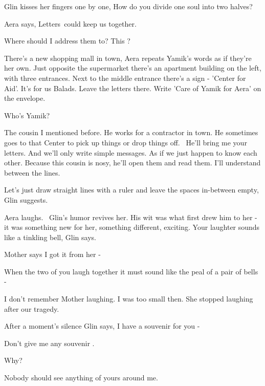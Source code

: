 \documentclass[12pt]{book}
\begin{document}
Glin kisses her fingers one by one, {\textquotedbl}How do you divide one soul into two halves?{\textquotedbl}

Aera says, {\textquotedbl}Letters~could keep us together.{\textquotedbl}

{\textquotedbl}Where should I address them to? This ?{\textquotedbl}

{\textquotedbl}There's a new shopping mall in town,{\textquotedbl} Aera repeats Yamik's words as if they're her own.
{\textquotedbl}Just opposite the supermarket there's an apartment building on the left, with three entrances. Next to
the middle entrance there's a sign - {}'Center for Aid'. It's for us Balads. Leave the letters there. Write 'Care of
Yamik for Aera' on the envelope.{\textquotedbl}

{\textquotedbl}Who's Yamik?{\textquotedbl}

{\textquotedbl}The cousin I mentioned before. He works for a contractor in town. He sometimes goes to that Center to
pick up things or drop things off.~ He'll bring me your letters. And we'll only write simple messages. As if we just
happen to know each other. Because this cousin is nosy, he'll open them and read them. I'll understand between the
lines.{\textquotedbl}

{\textquotedbl}Let's just draw straight lines with a ruler and leave the spaces in-between empty,{\textquotedbl} Glin
suggests.

Aera laughs. ~Glin's humor revives her. His wit was what first drew him to her - it was something new for her, something
different, exciting. {\textquotedbl}Your laughter sounds like a tinkling bell,{\textquotedbl} Glin says.

{\textquotedbl}Mother says I got it from her -{\textquotedbl}

{\textquotedbl}When the two of you laugh together it must sound like the peal of a pair of bells -{\textquotedbl}

{\textquotedbl}I don't remember Mother laughing. I was too small then. She stopped laughing after our
tragedy.{\textquotedbl}

After a moment's silence Glin says, {\textquotedbl}I have a souvenir for you -{\textquotedbl}

{\textquotedbl}Don't give me any souvenir .{\textquotedbl}

{\textquotedbl}Why?{\textquotedbl}

{\textquotedbl}Nobody should see anything of yours around me.{\textquotedbl}
\end{document}
